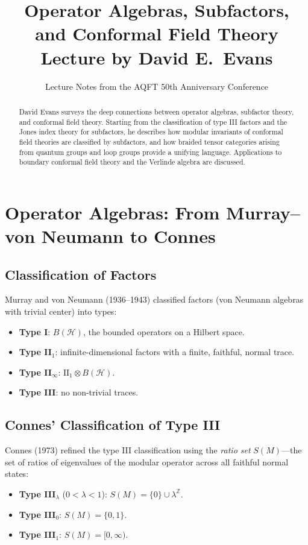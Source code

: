 \documentclass[11pt,a4paper]{article}
\title{\textbf{Operator Algebras, Subfactors,\\and Conformal Field Theory}\\[6pt]
\large Lecture by David E.\ Evans}
\author{Lecture Notes from the AQFT 50th Anniversary Conference}
\date{}
\begin{document}
\maketitle

\begin{abstract}
David Evans surveys the deep connections between operator algebras, subfactor theory,
and conformal field theory. Starting from the classification of type III factors and
the Jones index theory for subfactors, he describes how modular invariants of
conformal field theories are classified by subfactors, and how braided tensor
categories arising from quantum groups and loop groups provide a unifying language.
Applications to boundary conformal field theory and the Verlinde algebra are discussed.
\end{abstract}

\tableofcontents

\section{Operator Algebras: From Murray--von Neumann to Connes}

\subsection{Classification of Factors}

Murray and von Neumann (1936--1943) classified factors (von Neumann algebras
with trivial center) into types:
\begin{itemize}[nosep]
  \item \textbf{Type I}: $B(\mathcal{H})$, the bounded operators on a Hilbert space.
  \item \textbf{Type II$_1$}: infinite-dimensional factors with a finite, faithful,
        normal trace.
  \item \textbf{Type II$_\infty$}: $\mathrm{II}_1 \otimes B(\mathcal{H})$.
  \item \textbf{Type III}: no non-trivial traces.
\end{itemize}

\subsection{Connes' Classification of Type III}

Connes (1973) refined the type III classification using the \emph{ratio set}
$S(M)$---the set of ratios of eigenvalues of the modular operator across
all faithful normal states:
\begin{itemize}[nosep]
  \item \textbf{Type III$_\lambda$} ($0 < \lambda < 1$): $S(M) = \{0\} \cup \lambda^{\mathbb{Z}}$.
  \item \textbf{Type III$_0$}: $S(M) = \{0, 1\}$.
  \item \textbf{Type III$_1$}: $S(M) = [0, \infty)$.
\end{itemize}
\end{document}
